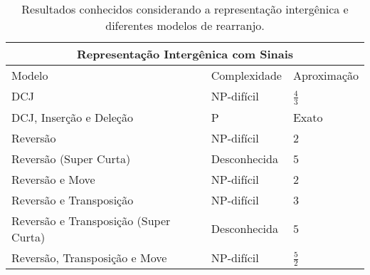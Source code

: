 \begin{table}[!htb]\label{table:GNCKDPJY}
  \caption[Sumarização dos resultados conhecidos considerando a representação intergênica de um genoma.]{Resultados conhecidos considerando a representação intergênica e diferentes modelos de rearranjo.}
  \centering
  \begin{tabular}{|p{8cm}|p{3cm}|p{3cm}|}
    \hline
    \multicolumn{3}{|c|}{Representação Intergênica com Sinais}                                                                                   \\ \hline
    Modelo                                  & Complexidade                                 & Aproximação                                         \\ \hline
    DCJ                                     & NP-difícil~\cite{2017-fertin-etal}           & $\frac{4}{3}$~\cite{2017-fertin-etal}               \\ \hline
    DCJ, Inserção e Deleção                 & P~\cite{2016b-bulteau-etal}                  & Exato~\cite{2016b-bulteau-etal}                     \\ \hline
    Reversão                                & NP-difícil~\cite{2021b-oliveira-etal}        & $2$~\cite{2021b-oliveira-etal}                      \\ \hline
    Reversão (Super Curta)                  & Desconhecida                                 & $5$~\cite{2019c-oliveira-etal}                      \\ \hline
    Reversão e Move                         & NP-difícil~\cite{2022b-brito-etal}           & $2$~\cite{2022b-brito-etal}                         \\ \hline
    Reversão e Transposição                 & NP-difícil~\cite{2021a-oliveira-etal}        & $3$~\cite{2021b-oliveira-etal}                      \\ \hline
    Reversão e Transposição (Super Curta)   & Desconhecida                                 & $5$~\cite{2019c-oliveira-etal}                      \\ \hline
    Reversão, Transposição e Move           & NP-difícil~\cite{2021a-oliveira-etal}        & $\frac{5}{2}$~\cite{2021a-oliveira-etal}            \\ \hline
  \end{tabular}

  \hfill \break


\end{table}
